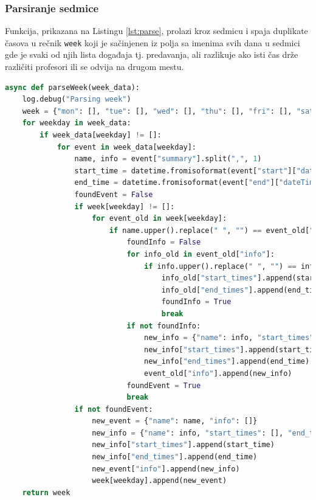 \documentclass[a4paper,11pt]{article}
\begin{document}
\subsubsection{Parsiranje sedmice}
Funkcija, prikazana na Listingu \ref{lst:parse}, prolazi kroz sedmicu i spaja duplikate časova u rečnik \texttt{week} koji je sačinjenen iz polja sa imenima svih dana u sedmici gde je svaki od njih lista događaja tj. predavanja, ali razlikuje ako isti čas drže različiti profesori ili se odvija na drugom mestu.
\begin{lstlisting}[language=Python, caption=Parsiranje sedmice, label=lst:parse]
async def parseWeek(week_data):
    log.debug("Parsing week")
    week = {"mon": [], "tue": [], "wed": [], "thu": [], "fri": [], "sat": [], "sun": []}
    for weekday in week_data:
        if week_data[weekday] != []:
            for event in week_data[weekday]:
                name, info = event["summary"].split(",", 1)
                start_time = datetime.fromisoformat(event["start"]["dateTime"]).strftime("%H:%M")
                end_time = datetime.fromisoformat(event["end"]["dateTime"]).strftime("%H:%M")
                foundEvent = False
                if week[weekday] != []:
                    for event_old in week[weekday]:
                        if name.upper().replace(" ", "") == event_old["name"].upper().replace(" ", ""):
                            foundInfo = False
                            for info_old in event_old["info"]:
                                if info.upper().replace(" ", "") == info_old["name"].upper().replace(" ", ""):
                                    info_old["start_times"].append(start_time)
                                    info_old["end_times"].append(end_time)
                                    foundInfo = True
                                    break
                            if not foundInfo:
                                new_info = {"name": info, "start_times": [], "end_times": []}
                                new_info["start_times"].append(start_time)
                                new_info["end_times"].append(end_time)
                                event_old["info"].append(new_info)
                            foundEvent = True
                            break
                if not foundEvent:
                    new_event = {"name": name, "info": []}
                    new_info = {"name": info, "start_times": [], "end_times": []}
                    new_info["start_times"].append(start_time)
                    new_info["end_times"].append(end_time)
                    new_event["info"].append(new_info)
                    week[weekday].append(new_event)
    return week
\end{lstlisting}
\newpage
\end{document}
